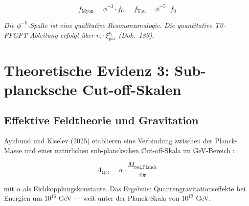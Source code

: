 	\begin{equation}
		 f_{\text{Myon}} = \phi^{-3} \cdot f_0, \quad f_{\text{Tau}} = \phi^{-5} \cdot f_0
	\end{equation}

	\begin{table}[h]
		\centering
		\caption{Leptonen als Resonanzen -- qualitative Analogie und T0-FFGFT-Werte (Dok.~189)}
		{\footnotesize{}} %
		\begin{center}{\small\textit{Die $\phi^{-k}$-Spalte ist eine qualitative Resonanzanalogie.
			Die quantitative T0-FFGFT-Ableitung erfolgt über $r_i\cdot\xi_{\text{par}}^{p_i}$ (Dok.~189).}}
		\end{center}
	\end{table}
	
	\section{Theoretische Evidenz 3: Sub-plancksche Cut-off-Skalen}
	
	\subsection{Effektive Feldtheorie und Gravitation}
	
	Aynbund und Kiselev (2025) etablieren eine Verbindung zwischen der Planck-Masse und einer natürlichen sub-planckschen Cut-off-Skala im GeV-Bereich \cite{Aynbund2025}:
	
	\begin{equation}
		\Lambda_{\text{QG}} = \alpha \cdot \frac{M_{\text{red,Planck}}}{4\pi}
	\end{equation}
	
	mit $\alpha$ als Eichkopplungskonstante. Das Ergebnis: Quantengravitationseffekte bei Energien um $10^{16}$ GeV — weit unter der Planck-Skala von $10^{19}$ GeV.
	
